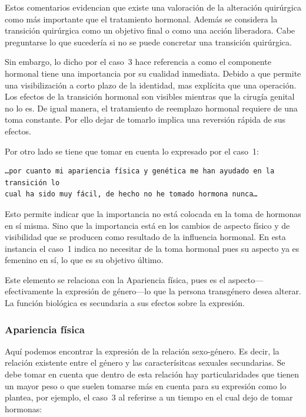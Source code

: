 Estos comentarios evidencian que existe una valoración de la alteración
quirúrgica como más importante que el tratamiento hormonal. Además se considera
la transición quirúrgica como un objetivo final o como una acción liberadora.
Cabe preguntarse lo que sucedería si no se puede concretar una transición
quirúrgica.

Sin embargo, lo dicho por el caso~3 hace referencia a como el componente
hormonal tiene una importancia por su cualidad inmediata. Debido a que permite
una visibilización a corto plazo de la identidad, mas explícita que una
operación. Los efectos de la transición hormonal son visibles mientras que la
cirugía genital no lo es. De igual manera, el tratamiento de reemplazo hormonal
requiere de una toma constante. Por ello dejar de tomarlo implica una reversión
rápida de sus efectos.

Por otro lado se tiene que tomar en cuenta lo expresado por el caso~1:

\begin{verbatim}
…por cuanto mi apariencia física y genética me han ayudado en la transición lo
cual ha sido muy fácil, de hecho no he tomado hormona nunca…
\end{verbatim}

Esto permite indicar que la importancia no está colocada en la toma de hormonas
en sí misma. Sino que la importancia está en los cambios de aspecto físico y de
visibilidad que se producen como resultado de la influencia hormonal. En esta
instancia el caso~1 indica no necesitar de la toma hormonal pues su aspecto ya
es femenino en sí, lo que es su objetivo último.

Este elemento se relaciona con la Apariencia física, pues es el aspecto—
efectivamente la expresión de género—lo que la persona transgénero desea alterar. La
función biológica es secundaria a sus efectos sobre la expresión.

\subsubsection{Apariencia física}

Aquí podemos encontrar la expresión de la relación sexo-género. Es decir, la
relación existente entre el género y las caracterísitcas sexuales secundarias.
Se debe tomar en cuenta que dentro de esta relación hay particularidades que
tienen un mayor peso o que suelen tomarse más en cuenta para su expresión como
lo plantea, por ejemplo, el caso~3 al referirse a un tiempo en el cual dejo de
tomar hormonas:

